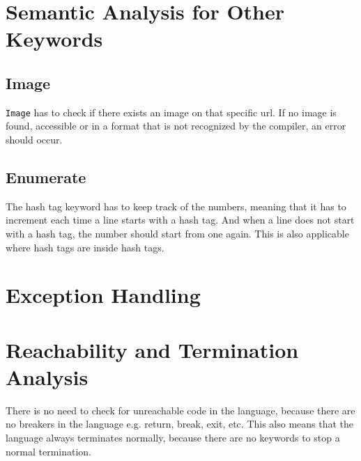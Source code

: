 \section{Semantic Analysis for Other Keywords}
     \subsection{Image}
\texttt{Image} has to check if there exists an image on that specific url. If no image is found, accessible or in a format that is not recognized by the compiler, an error should occur.


     \subsection{Enumerate}
The hash tag keyword has to keep track of the numbers, meaning that it has to increment each time a line starts with a hash tag. And when a line does not start with a hash tag, the number should start from one again. This is also applicable where hash tags are inside hash tags.

\section{Exception Handling}




\section{Reachability and Termination Analysis}
There is no need to check for unreachable code in the language, because there are no breakers in the language e.g. return, break, exit, etc.
This also means that the language always terminates normally, because there are no keywords to stop a normal termination.

